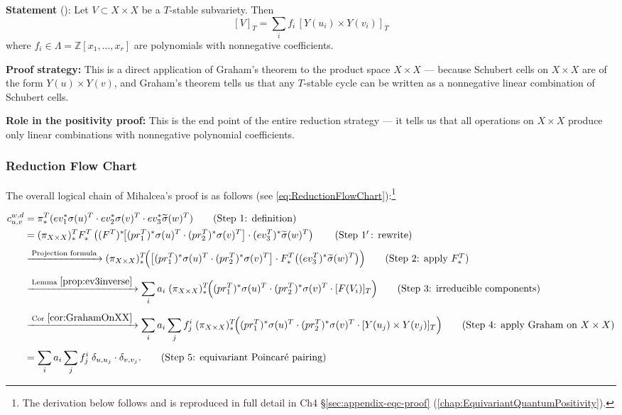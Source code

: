 \textbf{Statement} (\cite[ Corollary 6.2]{Mihalcea}): Let $V \subset X \times X$ be a $T$-stable subvariety. Then
$$[V]_T = \sum_i f_i \, [Y(u_i) \times Y(v_i)]_T$$
where $f_i \in \Lambda = \mathbb{Z}[x_1,\ldots,x_r]$ are polynomials with nonnegative coefficients.

\textbf{Proof strategy:} This is a direct application of Graham's theorem to the product space $X \times X$ --- because Schubert cells on $X \times X$ are of the form $Y(u) \times Y(v)$, and Graham's theorem tells us that any $T$-stable cycle can be written as a nonnegative linear combination of Schubert cells.\ 

\textbf{Role in the positivity proof:} This is the end point of the entire reduction strategy --- it tells us that all operations on $X \times X$ produce only linear combinations with nonnegative polynomial coefficients.\ 

\subsubsection{Reduction Flow Chart}
\label{sec:ReductionFlowChart}

The overall logical chain of Mihalcea's proof is as follows (see \cref{eq:ReductionFlowChart}):\footnote{The derivation below follows \cite[Section 6]{Mihalcea} and is reproduced in full detail in Ch4 \S\cref{sec:appendix-eqc-proof} (\cref{chap:EquivariantQuantumPositivity}).}

\begin{align}
\label{eq:ReductionFlowChart}
c_{u,v}^{w,d} &= \pi_*^T(ev_1^*\sigma(u)^T \cdot ev_2^*\sigma(v)^T \cdot ev_3^*\widetilde{\sigma}(w)^T) \tag{Step 1: definition} \\
&= (\pi_{X \times X})_*^T F_*^T\left((F^T)^*\!\big[(pr_1^T)^*\sigma(u)^T \cdot (pr_2^T)^*\sigma(v)^T\big] \cdot (ev_3^T)^*\widetilde{\sigma}(w)^T\right) \tag{Step 1$'$\,: rewrite} \\[4pt]
&\xrightarrow{\;\text{Projection formula}\;} (\pi_{X \times X})_*^T\!\Big(\big[(pr_1^T)^*\sigma(u)^T \cdot (pr_2^T)^*\sigma(v)^T\big] \cdot F_*^T\big((ev_3^T)^*\widetilde{\sigma}(w)^T\big)\Big) \tag{Step 2: apply $F_*^T$} \\[4pt]
&\xrightarrow{\;\text{Lemma }\cref{prop:ev3inverse}\;} \sum_i a_i \; (\pi_{X \times X})_*^T\!\Big((pr_1^T)^*\sigma(u)^T \cdot (pr_2^T)^*\sigma(v)^T \cdot [F(V_i)]_T\Big) \tag{Step 3: irreducible components} \\[4pt]
&\xrightarrow{\;\text{Cor }\cref{cor:GrahamOnXX}\;} \sum_i a_i \sum_j f_j^i \; (\pi_{X \times X})_*^T\!\Big((pr_1^T)^*\sigma(u)^T \cdot (pr_2^T)^*\sigma(v)^T \cdot [Y(u_j)\times Y(v_j)]_T\Big) \tag{Step 4: apply Graham on $X\times X$} \\[4pt]
&= \sum_i a_i \sum_j f_j^i \; \delta_{u,u_j} \cdot \delta_{v,v_j}. \tag{Step 5: equivariant Poincar\'e pairing}
\end{align}

